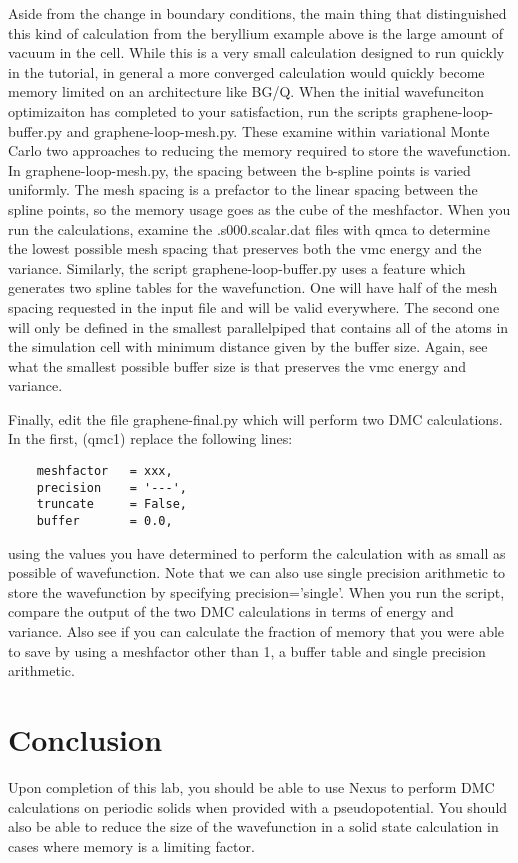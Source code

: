 Aside from the change in boundary conditions, the main thing that distinguished this kind of calculation from the beryllium example above is the large amount of vacuum in the cell.  While this is a very small calculation designed to run quickly in the tutorial, in general a more converged calculation would quickly become memory limited on an architecture like BG/Q.  When the initial wavefunciton optimizaiton has completed to your satisfaction, run the scripts graphene-loop-buffer.py and graphene-loop-mesh.py.  These examine within variational Monte Carlo two approaches to reducing the memory required to store the wavefunction.  In graphene-loop-mesh.py, the spacing between the b-spline points is varied uniformly.  The mesh spacing is a prefactor to the linear spacing between the spline points, so the memory usage goes as the cube of the meshfactor.  When you run the calculations, examine the .s000.scalar.dat files with qmca to determine the lowest possible mesh spacing that preserves both the vmc energy and the variance.  Similarly, the script graphene-loop-buffer.py uses a feature which generates two spline tables for the wavefunction.  One will have half of the mesh spacing requested in the input file and will be valid everywhere.  The second one will only be defined in the smallest parallelpiped that contains all of the atoms in the simulation cell with minimum distance given by the buffer size.  Again, see what the smallest possible buffer size is that preserves the vmc energy and variance.

Finally, edit the file graphene-final.py which will perform two DMC calculations.  In the first, (qmc1) replace the following lines:
\begin{lstlisting}
    meshfactor   = xxx,
    precision    = '---',
    truncate     = False,
    buffer       = 0.0,
\end{lstlisting}
using the values you have determined to perform the calculation with as small as possible of wavefunction.  Note that we can also use single precision arithmetic to store the wavefunction by specifying precision='single'.  When you run the script, compare the output of the two DMC calculations in terms of energy and variance.  Also see if you can calculate the fraction of memory that you were able to save by using a meshfactor other than 1, a buffer table and single precision arithmetic.

\section{Conclusion}
Upon completion of this lab, you should be able to use Nexus to perform DMC calculations on periodic solids when provided with a pseudopotential.  You should also be able to reduce the size of the wavefunction in a solid state calculation in cases where memory is a limiting factor.

